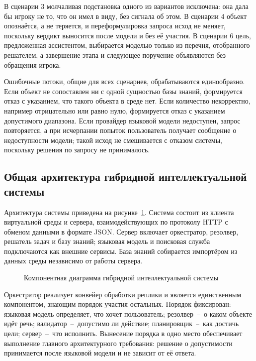 В сценарии 3 молчаливая подстановка одного из вариантов исключена: она дала бы игроку
не то, что он имел в виду, без сигнала об этом. В сценарии 4 объект опознаётся, а не
теряется, и переформулировка запроса исход не меняет, поскольку вердикт выносится после
модели и без её участия. В сценарии 6 цель, предложенная ассистентом, выбирается моделью
только из перечня, отобранного решателем, а завершение этапа и следующее поручение
объявляются без обращения игрока.

Ошибочные потоки, общие для всех сценариев, обрабатываются единообразно. Если объект
не сопоставлен ни с одной сущностью базы знаний, формируется отказ с указанием, что
такого объекта в среде нет. Если количество некорректно, например отрицательно или
равно нулю, формируется отказ с указанием допустимого диапазона. Если провайдер
языковой модели недоступен, запрос повторяется, а при исчерпании попыток пользователь
получает сообщение о недоступности модели; такой исход не смешивается с отказом
системы, поскольку решения по запросу не принималось.

\subsection{Общая архитектура гибридной интеллектуальной системы}

Архитектура системы приведена на рисунке~\ref{fig:architecture}. Система состоит из
клиента виртуальной среды и сервера, взаимодействующих по протоколу HTTP с обменом
данными в формате JSON. Сервер включает оркестратор, резолвер, решатель задач и базу
знаний; языковая модель и поисковая служба подключаются как внешние сервисы. База знаний собирается
импортёром из данных среды независимо от работы сервера.

\begin{figure}[!htb]
  \centering
  
  \caption{Компонентная диаграмма гибридной интеллектуальной системы}
  \label{fig:architecture}
\end{figure}

Оркестратор реализует конвейер обработки реплики и является единственным компонентом,
знающим порядок участия остальных. Порядок фиксирован: языковая модель определяет,
что хочет пользователь; резолвер~--~о каком объекте идёт речь; валидатор~--~допустимо
ли действие; планировщик~--~как достичь цели; сервер~--~что исполнить. Вынесение
порядка в одно место обеспечивает выполнение главного архитектурного требования:
решение о допустимости принимается после языковой модели и не зависит от её ответа.

